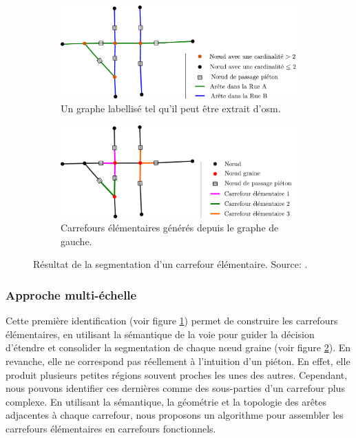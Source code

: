 \begin{figure}[ht]
    \centering
    \begin{subfigure}[t]{.49\linewidth}
        \includegraphics[width=\textwidth]{images/modelisation/segmentation/segmentation-step1.pdf}
        \caption{Un graphe labellisé tel qu'il peut être extrait d'\gls{osm}.\label{fig:modelisation_segmentation_step1}}
    \end{subfigure}
    \begin{subfigure}[t]{.49\linewidth}
        \includegraphics[width=\textwidth]{images/modelisation/segmentation/segmentation-step2.pdf}
        \caption{Carrefours élémentaires générés depuis le graphe de gauche. \label{fig:modelisation_segmentation_step2}}
    \end{subfigure}
    \caption[Segmentation d'un carrefour élémentaire]{Résultat de la segmentation d'un carrefour élémentaire. Source: \citep{Favreau2022}.}
    \label{fig:modelisation_segmentation_step1&2}
\end{figure}

\subsubsection{Approche multi-échelle}

Cette première identification (voir figure \ref{fig:modelisation_segmentation_step1}) permet de construire les carrefours élémentaires, en utilisant la sémantique de la voie pour guider la décision d'étendre et consolider la segmentation de chaque nœud graine (voir figure \ref{fig:modelisation_segmentation_step2}). En revanche, elle ne correspond pas réellement à l'intuition d'un piéton. En effet, elle produit plusieurs petites régions souvent proches les unes des autres. Cependant, nous pouvons identifier ces dernières comme des sous-parties d'un carrefour plus complexe. En utilisant la sémantique, la géométrie et la topologie des arêtes adjacentes à chaque carrefour, nous proposons un algorithme pour assembler les carrefours élémentaires en carrefours fonctionnels.

